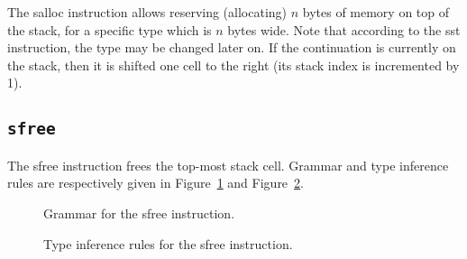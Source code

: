 The {\Iformat salloc} instruction allows reserving (allocating) $n$ bytes of memory on top of the stack, for a specific type which is $n$ bytes wide.
Note that according to the {\Iformat sst} instruction, the type may be changed later on.
If the continuation is currently on the stack, then it is shifted one cell to the right (its stack index is incremented by 1).

\subsection{\texttt{sfree}}\label{subsec:nstar-instructionset-stack-sfree}

The {\Iformat sfree} instruction frees the top-most stack cell.
Grammar and type inference rules are respectively given in Figure~\ref{fig:nstar-instructionset-stack-sfree-grammar} and Figure~\ref{fig:nstar-instructionset-stack-sfree-typerules}.

\begin{figure}[H]
	\centering


	\caption{Grammar for the {\Iformat sfree} instruction.}
	\label{fig:nstar-instructionset-stack-sfree-grammar}
\end{figure}

\begin{figure}[H]
	\centering


	\caption{Type inference rules for the {\Iformat sfree} instruction.}
	\label{fig:nstar-instructionset-stack-sfree-typerules}
\end{figure}


